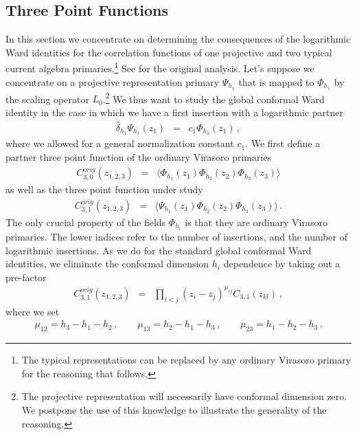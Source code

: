 \documentclass[12pt]{article}
\numberwithin{equation}{section}
\numberwithin{equation}{section}
\numberwithin{table}{section}\setlength{\multlinegap}{25pt}
\begin{document}
\subsection{Three Point Functions}
In this section we concentrate on determining the consequences of the logarithmic Ward identities for
 the correlation functions of one projective and two typical current algebra primaries.\footnote{The typical representations can be replaced by
any ordinary Virasoro primary for the reasoning that follows.} See \cite{Flohr:2001tj,Flohr:2001zs,Flohr:2005qq} for the original analysis.
Let's suppose we concentrate on a projective representation primary $\Psi_{h_1}$ that is mapped to
$\Phi_{h_1}$ by the scaling operator $L_0$.\footnote{The projective representation will necessarily have conformal dimension zero. We postpone the use
of this knowledge to illustrate the generality of the reasoning.}
We thus want to study the global conformal Ward identity in the case in which we have a first insertion with a logarithmic partner
\begin{eqnarray}
\hat{\delta}_{h_1} \Psi_{h_1}(z_1) &=& c_1 \Phi_{h_1} (z_1) 
\, ,
\end{eqnarray}
where we allowed for a general normalization constant $c_1$.
We first define a partner three point function of the ordinary Virasoro primaries
\begin{eqnarray}
C^{orig}_{3,0}(z_{1,2,3}) &=& \langle \Phi_{h_1}(z_1) \Phi_{h_2}(z_2)\Phi_{h_3}(z_3) \rangle
\end{eqnarray}
as well as the three point function under study
\begin{eqnarray}
C_{3,1}^{orig}(z_{1,2,3}) &=& \langle \Psi_{h_1}(z_1) \Phi_{h_2}(z_2)\Phi_{h_3}(z_3) \rangle \, .
\end{eqnarray}
The only crucial property of the fields $\Phi_{h_i}$ is that they are ordinary Virasoro primaries.
The lower indices refer to the number of insertions, and the number of logarithmic insertions.
As we do for the standard global conformal Ward identities, we eliminate the conformal dimension $h_i$ dependence
by taking out a pre-factor
\begin{eqnarray}
C_{3,1}^{orig}(z_{1,2,3}) &=& \prod_{i<j} (z_i-z_j)^{\mu_{ij}} C_{3,1}(z_{kl}) \, ,
\end{eqnarray}
where we set
\begin{eqnarray}
\mu_{12} = h_3 -h_1-h_2 \, , \qquad
\mu_{13} = h_2 -h_1-h_3\, , \qquad
\mu_{23} = h_1 - h_2 -h_3 \, .
\end{eqnarray}
\end{document}
